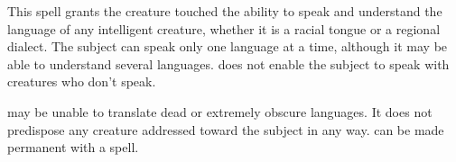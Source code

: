 \spelldur{\durlong}
\begin{spelleffect}
  This spell grants the creature touched the ability to speak and understand the language of any intelligent creature, whether it is a racial tongue or a regional dialect. The subject can speak only one language at a time, although it may be able to understand several languages.  does not enable the subject to speak with creatures who don't speak.
\end{spelleffect}
\begin{spellnotes}
   may be unable to translate dead or extremely obscure languages. It does not predispose any creature addressed toward the subject in any way.  can be made permanent with a  spell.
\end{spellnotes}

